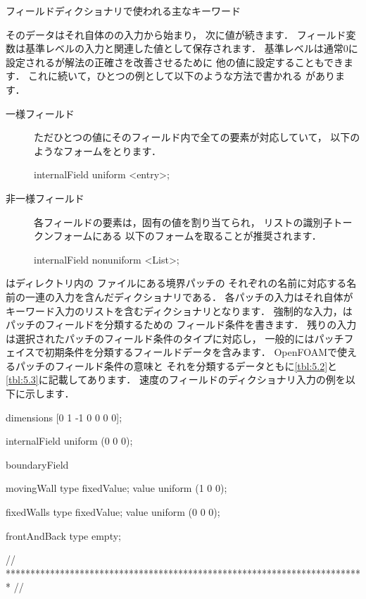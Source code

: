 \begin{table}[ht]
 
 \caption{フィールドディクショナリで使われる主なキーワード}
 \label{tbl:4.3}
\end{table}


そのデータはそれ自体のの入力から始まり，
次に値が続きます．
フィールド変数は基準レベルの入力と関連した値として保存されます．
基準レベルは通常$0$に設定されるが解法の正確さを改善させるために
他の値に設定することもできます．
これに続いて，ひとつの例として以下のような方法で書かれる
があります．
\begin{description}
 \item[一様フィールド]
            ただひとつの値にそのフィールド内で全ての要素が対応していて，
            以下のようなフォームをとります．
\begin{OFverbatim}[file]
internalField uniform <entry>;
\end{OFverbatim}
 \item[非一様フィールド]
            各フィールドの要素は，固有の値を割り当てられ，
            リストの識別子トークンフォームにある
            以下のフォームを取ることが推奨されます．
\begin{OFverbatim}[file]
internalField nonuniform <List>;
\end{OFverbatim}
\end{description}
はディレクトリ内の
ファイルにある境界パッチの
それぞれの名前に対応する名前の一連の入力を含んだディクショナリである．
各パッチの入力はそれ自体がキーワード入力のリストを含むディクショナリとなります．
強制的な入力，はパッチのフィールドを分類するための
フィールド条件を書きます．
残りの入力は選択されたパッチのフィールド条件のタイプに対応し，
一般的にはパッチフェイスで初期条件を分類するフィールドデータを含みます．
OpenFOAMで使えるパッチのフィールド条件の意味と
それを分類するデータともに\autoref{tbl:5.2}と
\autoref{tbl:5.3}に記載してあります．
速度のフィールドのディクショナリ入力の例を以下に示します．
\begin{OFverbatim}[file, linenum=17]
dimensions      [0 1 -1 0 0 0 0];

internalField   uniform (0 0 0);

boundaryField
{
    movingWall
    {
        type            fixedValue;
        value           uniform (1 0 0);
    }

    fixedWalls
    {
        type            fixedValue;
        value           uniform (0 0 0);
    }

    frontAndBack
    {
        type            empty;
    }
}

// ************************************************************************* //
\end{OFverbatim}


